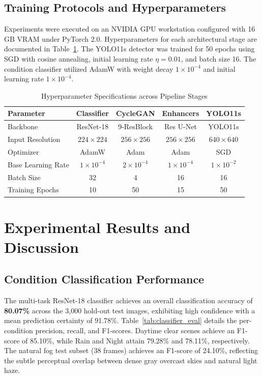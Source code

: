 \documentclass[conference]{IEEEtran}
\begin{document}
\subsection{Training Protocols and Hyperparameters}
Experiments were executed on an NVIDIA GPU workstation configured with 16 GB VRAM under PyTorch 2.0. Hyperparameters for each architectural stage are documented in Table~\ref{tab:hyperparams}. The YOLO11s detector was trained for 50 epochs using SGD with cosine annealing, initial learning rate $\eta = 0.01$, and batch size 16. The condition classifier utilized AdamW with weight decay $1 \times 10^{-4}$ and initial learning rate $1 \times 10^{-4}$.

\begin{table}[htbp]
\caption{Hyperparameter Specifications across Pipeline Stages}
\label{tab:hyperparams}
\centering
\small
\begin{tabular}{lcccc}
\toprule
\textbf{Parameter} & \textbf{Classifier} & \textbf{CycleGAN} & \textbf{Enhancers} & \textbf{YOLO11s} \\
\midrule
Backbone & ResNet-18 & 9-ResBlock & Res U-Net & YOLO11s \\
Input Resolution & $224 \times 224$ & $256 \times 256$ & $256 \times 256$ & $640 \times 640$ \\
Optimizer & AdamW & Adam & Adam & SGD \\
Base Learning Rate & $1 \times 10^{-4}$ & $2 \times 10^{-4}$ & $1 \times 10^{-4}$ & $1 \times 10^{-2}$ \\
Batch Size & 32 & 4 & 16 & 16 \\
Training Epochs & 10 & 50 & 15 & 50 \\
\bottomrule
\end{tabular}
\end{table}

\section{Experimental Results and Discussion}
\label{sec:results}

\subsection{Condition Classification Performance}
The multi-task ResNet-18 classifier achieves an overall classification accuracy of \textbf{80.07\%} across the 3,000 hold-out test images, exhibiting high confidence with a mean prediction certainty of 91.78\%. Table~\ref{tab:classifier_eval} details the per-condition precision, recall, and F1-scores. Daytime clear scenes achieve an F1-score of 85.10\%, while Rain and Night attain 79.28\% and 78.11\%, respectively. The natural fog test subset (38 frames) achieves an F1-score of 24.10\%, reflecting the subtle perceptual overlap between dense gray overcast skies and natural light haze.
\end{document}
